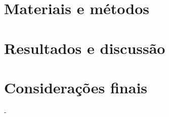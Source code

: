 \documentclass[
	12pt,				%
	openright,			%
	twoside,			%
	a4paper,			%
	chapter=TITLE,		%
	english,			%
	french,				%
	spanish,			%
	brazil,				%
	hyphens
	]{abntex2}
\theoremstyle{definition}
\theoremstyle{definition}
\begin{document}
\chapter{Materiais e métodos} \label{metodologia}



\chapter{Resultados e discussão} \label{results}


% 

\chapter{Considerações finais} \label{conclusao}


-
\postextual




%
%


\begin{apendicesenv}



\end{apendicesenv}



\begin{anexosenv}



\end{anexosenv}


\printindex
\end{document}
